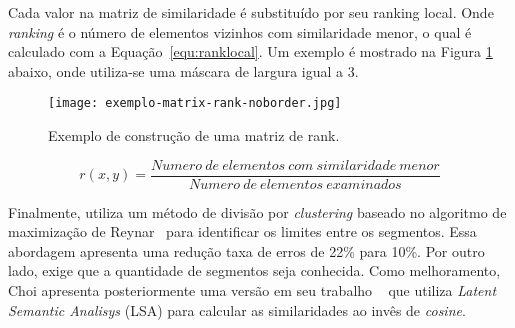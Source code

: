 Cada valor na matriz de similaridade é substituído por seu ranking local. Onde \textit{ranking} é o número de elementos vizinhos com similaridade menor, o qual é calculado com a Equação~\ref{equ:ranklocal}. Um exemplo é mostrado na Figura \ref{fig:exemplomatrixrank} abaixo, onde utiliza-se uma máscara de largura igual a 3.



  \begin{figure}[!h]

	\centering
	\texttt{[image: exemplo-matrix-rank-noborder.jpg]}
	\caption{Exemplo de construção de uma matriz de rank.}
	\label{fig:exemplomatrixrank}

  \end{figure}




\begin{equation}
r(x,y) = \frac
{Numero\ de\ elementos\ com\ similaridade\ menor}
{Numero\ de\ elementos\ examinados}
\label{equ:ranklocal}
\end{equation}


	
Finalmente, utiliza um método de divisão por \textit{clustering} baseado no algoritmo de maximização de Reynar~\cite{Reynar1998} para identificar os limites entre os segmentos. Essa abordagem apresenta uma redução taxa de erros de 22\% para 10\%. Por outro lado, exige que a quantidade de segmentos seja conhecida.
Como melhoramento, Choi apresenta posteriormente uma versão em seu trabalho ~\cite{Choi2001-LSA} que utiliza \textit{Latent Semantic Analisys} (LSA) para calcular as similaridades ao invês de \textit{cosine}.













	